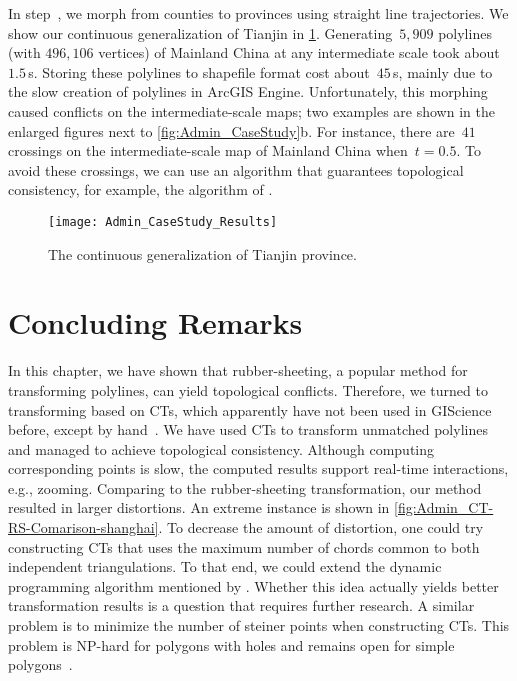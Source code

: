 In step~, we morph from counties to provinces 
using straight line trajectories. 
We show our continuous generalization of Tianjin in 
\fig\ref{fig:Admin_CaseStudy_Tianjin}.
Generating~$5{,}909$ polylines (with $496{,}106$ vertices) of 
Mainland China at any intermediate scale took about~$1.5\,$s.
Storing these polylines to shapefile format cost about~$45\,$s,
mainly due to the slow creation of polylines in ArcGIS Engine.
Unfortunately, this morphing caused conflicts on the 
intermediate-scale maps; 
two examples are shown in the enlarged figures next to
\fig\ref{fig:Admin_CaseStudy}b. 
For instance, there are~$41$ crossings on the 
intermediate-scale map of Mainland China when~$t=0.5$. 
To avoid these crossings, we can use an algorithm 
that guarantees topological consistency, 
for example, the algorithm of \textcite{GotsmanS2001}.

\begin{figure}[tb]
\centering
\texttt{[image: Admin\_CaseStudy\_Results]}
\caption{The continuous generalization of Tianjin province.}
\label{fig:Admin_CaseStudy_Tianjin}
\end{figure}


\section{Concluding Remarks}
\label{sec:Admin_Conclusions}

In this chapter, we have shown that rubber-sheeting, 
a popular method for transforming polylines, 
can yield topological conflicts.
Therefore, we turned to transforming based on CTs,
which apparently have not been used 
in GIScience before, 
except by hand~\parencite[e.g.,][]{Fuse2004}.
We have used CTs to 
transform unmatched polylines and 
managed to achieve topological consistency. 
Although computing corresponding points is slow, 
the computed results support 
real-time interactions, e.g., zooming.
Comparing to the rubber-sheeting transformation, 
our method resulted in larger distortions.  
An extreme instance is shown in
\fig\ref{fig:Admin_CT-RS-Comarison-shanghai}.
To decrease the amount of distortion, 
one could try constructing CTs 
that uses the maximum number of chords common to 
both independent triangulations.
To that end, we could extend the dynamic programming algorithm
mentioned by \textcite{Diwan2011Triangulations}.
Whether this idea actually yields better transformation results 
is a question that requires further research.
A similar problem is to minimize the number of steiner points 
when constructing CTs.
This problem is NP-hard for polygons with holes and 
remains open for simple polygons~\parencite{Lubiw2017CT}.

